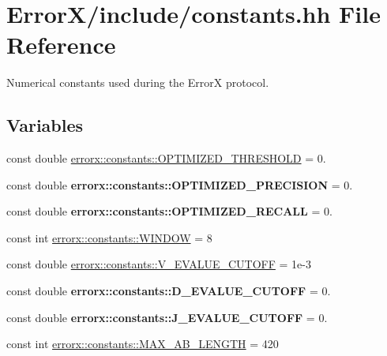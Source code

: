 \hypertarget{constants_8hh}{}\section{Error\+X/include/constants.hh File Reference}
\label{constants_8hh}


Numerical constants used during the ErrorX protocol.  


\subsection*{Variables}
\begin{DoxyCompactItemize}
\item 
const double \mbox{\hyperlink{constants_8hh_aadcca59533023a224a8b90e25435295f}{errorx\+::constants\+::\+O\+P\+T\+I\+M\+I\+Z\+E\+D\+\_\+\+T\+H\+R\+E\+S\+H\+O\+LD}} = 0.
\item 
\mbox{\label{constants_8hh_a07f7b32e104d4f13f2a3126de8ccbfe9}} 
const double {\bfseries errorx\+::constants\+::\+O\+P\+T\+I\+M\+I\+Z\+E\+D\+\_\+\+P\+R\+E\+C\+I\+S\+I\+ON} = 0.
\item 
\mbox{\label{constants_8hh_aa29782f8684142e28354544773fb7d4e}} 
const double {\bfseries errorx\+::constants\+::\+O\+P\+T\+I\+M\+I\+Z\+E\+D\+\_\+\+R\+E\+C\+A\+LL} = 0.
\item 
const int \mbox{\hyperlink{constants_8hh_acb2880ac79b3effae46d288c9401ec9b}{errorx\+::constants\+::\+W\+I\+N\+D\+OW}} = 8
\item 
const double \mbox{\hyperlink{constants_8hh_afd1a9537101a0b1aa366f9253916a7ee}{errorx\+::constants\+::\+V\+\_\+\+E\+V\+A\+L\+U\+E\+\_\+\+C\+U\+T\+O\+FF}} = 1e-\/3
\item 
\mbox{\label{constants_8hh_ab293ef066af08fbc99d972757cb32b66}} 
const double {\bfseries errorx\+::constants\+::\+D\+\_\+\+E\+V\+A\+L\+U\+E\+\_\+\+C\+U\+T\+O\+FF} = 0.
\item 
\mbox{\label{constants_8hh_a6d52dce2629339293084b5e2ef6b7bd6}} 
const double {\bfseries errorx\+::constants\+::\+J\+\_\+\+E\+V\+A\+L\+U\+E\+\_\+\+C\+U\+T\+O\+FF} = 0.
\item 
const int \mbox{\hyperlink{constants_8hh_a375af5a0f72048bbfc4165741c051a28}{errorx\+::constants\+::\+M\+A\+X\+\_\+\+A\+B\+\_\+\+L\+E\+N\+G\+TH}} = 420
\end{DoxyCompactItemize}


